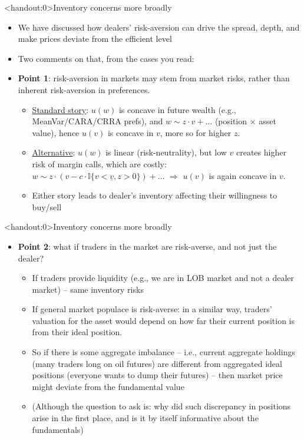 \documentclass[english,10pt
,aspectratio=169
]{beamer}
\begin{document}
\begin{frame}<handout:0>{Inventory concerns more broadly}
	\begin{itemize}
		\item We have discussed how dealers' risk-aversion can drive the spread, depth, and make prices deviate from the efficient level
		\item Two comments on that, from the cases you read:
		\item \textbf{Point 1}: risk-aversion in markets may stem from market risks, rather than inherent risk-aversion in preferences.
		\begin{itemize}
			\item \underline{Standard story}: $u(w)$ is concave in future wealth (e.g., MeanVar/CARA/CRRA prefs), and $w \sim z \cdot v + ...$ (position $\times$ asset value), hence $u(v)$ is concave in $v$, more so for higher $z$.
			\item \underline{Alternative}: $u(w)$ is linear (risk-neutrality), but low $v$ creates higher risk of margin calls, which are costly: $w \sim z \cdot \left( v - c \cdot \mathbb{I} \{ v < \underline{v}, z>0 \} \right) + ...$ $\Rightarrow$ $u(v)$ is again concave in $v$.
			\item Either story leads to dealer's inventory affecting their willingness to buy/sell
		\end{itemize}
	\end{itemize}
\end{frame}


\begin{frame}<handout:0>{Inventory concerns more broadly}
	\begin{itemize}
		\item \textbf{Point 2}: what if traders in the market are risk-averse, and not just the dealer?
		\begin{itemize}
			\item If traders provide liquidity (e.g., we are in LOB market and not a dealer market) -- same inventory risks
			\item If general market populace is risk-averse: in a similar way, traders' valuation for the asset would depend on how far their current position is from their ideal position.
			\item So if there is some aggregate imbalance -- i.e., current aggregate holdings (many traders long on oil futures) are different from aggregated ideal positions (everyone wants to dump their futures) -- then market price might deviate from the fundamental value
			\item (Although the question to ask is: why did such discrepancy in positions arise in the first place, and is it by itself informative about the fundamentals)
		\end{itemize}
	\end{itemize}
\end{frame}
\end{document}
